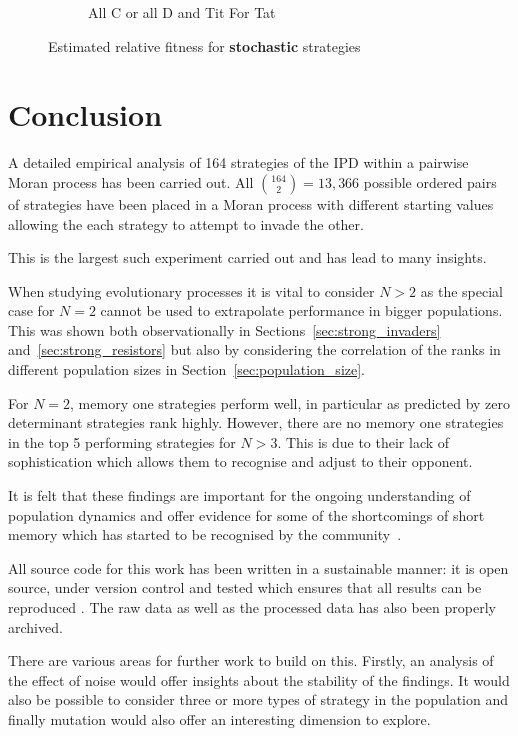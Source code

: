 \documentclass{article}
\begin{document}
\begin{figure}[!hbtp]
\begin{subfigure}[t]{.3\textwidth}
        \caption{All C or all D and Tit For Tat}
    \end{subfigure}%
    \caption{Estimated relative fitness
             for \textbf{stochastic} strategies}
    \label{fig:comparison_stochastic}
\end{figure}


\section{Conclusion}\label{sec:conclusion}

A detailed empirical analysis of 164 strategies of the IPD within a pairwise
Moran process has been carried out. All \(\binom{164}{2}=13,366\) possible
ordered pairs of strategies have been placed in a Moran process with different
starting values allowing the each strategy to attempt to invade the other.

This is the largest such experiment carried out and has lead to many insights.

When studying evolutionary processes it is vital to consider \(N>2\) as the
special case for \(N=2\) cannot be used to extrapolate performance in bigger
populations. This was shown both observationally in
Sections~\ref{sec:strong_invaders} and~\ref{sec:strong_resistors} but also by
considering the correlation of the ranks in different population sizes in
Section~\ref{sec:population_size}.

For \(N=2\), memory one strategies perform well, in particular as predicted by
\cite{Press2012} zero determinant strategies rank highly. However, there are no
memory one strategies in the top 5 performing strategies for \(N>3\). This is
due to their lack of sophistication which allows them to recognise and adjust to
their opponent.

It is felt that these findings are important for the ongoing understanding of
population dynamics and offer evidence for some of the shortcomings of short
memory which has started to be recognised by the community~\cite{Hilbe2017}.

All source code for this work has been written in a sustainable manner: it is
open source, under version control and tested which ensures that all results can
be reproduced \cite{Prlic2012, Sandve2013, Wilson2014}. The raw data as well as
the processed data has also been properly archived.

There are various areas for further work to build on this. Firstly, an analysis
of the effect of noise would offer insights about the stability of the findings.
It would also be possible to consider three or more types of strategy in the
population and finally mutation would also offer an interesting dimension to
explore.
\end{document}
